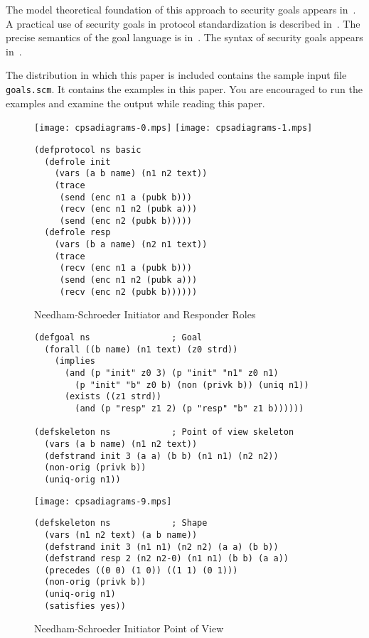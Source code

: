 \documentclass[12pt]{article}
\begin{document}
The model theoretical foundation of this approach to security goals
appears in~\cite{Guttman14}.  A practical use of security goals in
protocol standardization is described in~\cite{GuttmanLiskovRowe14}.
The precise semantics of the goal language is
in~\cite[Appendix~C]{cpsaspec09}.  The syntax of security goals
appears in~\cite[Table~2]{cpsaprimer09}.

The distribution in which this paper is included contains the sample
input {\cpsa} file \texttt{goals.scm}.  It contains the examples in
this paper.  You are encouraged to run the examples and examine the
output while reading this paper.


\begin{figure}
\begin{center}
\texttt{[image: cpsadiagrams-0.mps]}\hfil
\texttt{[image: cpsadiagrams-1.mps]}\\
\end{center}
\begin{center}
\begin{minipage}{3in}
\begin{verbatim}
(defprotocol ns basic
  (defrole init
    (vars (a b name) (n1 n2 text))
    (trace
     (send (enc n1 a (pubk b)))
     (recv (enc n1 n2 (pubk a)))
     (send (enc n2 (pubk b)))))
  (defrole resp
    (vars (b a name) (n2 n1 text))
    (trace
     (recv (enc n1 a (pubk b)))
     (send (enc n1 n2 (pubk a)))
     (recv (enc n2 (pubk b))))))
\end{verbatim}
\end{minipage}
\end{center}
\caption{Needham-Schroeder Initiator and Responder Roles}
\label{fig:ns roles}
\end{figure}

\begin{figure}
\begin{verbatim}
(defgoal ns                ; Goal
  (forall ((b name) (n1 text) (z0 strd))
    (implies
      (and (p "init" z0 3) (p "init" "n1" z0 n1)
        (p "init" "b" z0 b) (non (privk b)) (uniq n1))
      (exists ((z1 strd))
        (and (p "resp" z1 2) (p "resp" "b" z1 b))))))

(defskeleton ns            ; Point of view skeleton
  (vars (a b name) (n1 n2 text))
  (defstrand init 3 (a a) (b b) (n1 n1) (n2 n2))
  (non-orig (privk b))
  (uniq-orig n1))
\end{verbatim}
\begin{center}
\texttt{[image: cpsadiagrams-9.mps]}
\end{center}
\begin{verbatim}
(defskeleton ns            ; Shape
  (vars (n1 n2 text) (a b name))
  (defstrand init 3 (n1 n1) (n2 n2) (a a) (b b))
  (defstrand resp 2 (n2 n2-0) (n1 n1) (b b) (a a))
  (precedes ((0 0) (1 0)) ((1 1) (0 1)))
  (non-orig (privk b))
  (uniq-orig n1)
  (satisfies yes))
\end{verbatim}
\caption{Needham-Schroeder Initiator Point of View}
\label{fig:ns init}
\end{figure}
\end{document}
